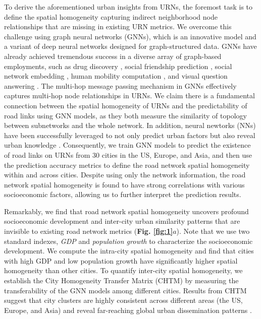 \documentclass[10pt]{wlscirep}
\begin{document}
To derive the aforementioned urban insights from URNs, the foremost task is to define the spatial homogeneity capturing indirect neighborhood node relationships that are missing in existing URN metrics. %
We overcome this challenge using graph neural networks (GNNs), which is an innovative model and a variant of deep neural networks designed for graph-structured data. GNNs have already achieved tremendous success in a diverse array of graph-based employments, such as drug discovery \cite{cheng2019network}, social friendship prediction \cite{jalili2017link}, social network embedding \cite{lerique2020joint}, human mobility computation \cite{ren2014predicting}, and visual question answering \cite{teney2017graph}. The multi-hop message passing mechanism in GNNs effectively captures multi-hop node relationships \cite{wu2020learning} in URNs. We claim there is a fundamental connection between the spatial homogeneity of URNs and the predictability of road links using GNN models, as they both measure the similarity of topology between subnetworks and the whole network. In addition, neural newtorks (NNs) have been successfully leveraged to not only predict urban factors\cite{gebru2017using} but also reveal urban knowledge \cite{abitbol2020interpretable,kempinska2019modelling}. Consequently, we train GNN models to predict the existence of road links on URNs from 30 cities in the US, Europe, and Asia, and then use the prediction accuracy metrics to define the road network spatial homogeneity within and across cities. Despite using only the network information, the road network spatial homogeneity is found to have strong correlations with various socioeconomic factors, allowing us to further interpret the prediction results. 

Remarkably, we find that road network spatial homogeneity uncovers profound socioeconomic development and inter-city urban similarity patterns that are invisible to existing road network metrics (\textbf{Fig. \ref{fig:1}$a$}). Note that we use two standard indexes, \textit{GDP} and \textit{population growth} to characterize the socioeconomic development. We compute the intra-city spatial homogeneity and find that cities with high GDP and low population growth have significantly higher spatial homogeneity than other cities. To quantify inter-city spatial homogeneity, we establish the City Homogeneity Transfer Matrix (CHTM) by measuring the transferability of the GNN models among different cities. Results from CHTM suggest that city clusters are highly consistent across different areas (the US, Europe, and Asia) and reveal far-reaching global urban dissemination patterns \cite{peng2011urbanization}. 
\end{document}
